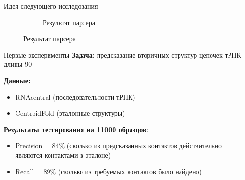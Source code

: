 \documentclass{beamer}
\begin{document}
\begin{frame}{Идея следующего исследования}
\begin{figure}
\begin{subfigure}{.3\textwidth}
\end{subfigure}
\begin{subfigure}{.3\textwidth}
  \centering
  \caption{Результат парсера}
\end{subfigure}%
\end{figure}

\end{frame}

\begin{frame}{Первые эксперименты}
\textbf{Задача:} предсказание вторичных структур цепочек тРНК длины 90

\vspace{6mm}
\textbf{Данные:}
\begin{itemize}
    \item RNAcentral (последовательности тРНК)
    \item CentroidFold (эталонные структуры)
\end{itemize}

\vspace{6mm}

\textbf{Результаты тестирования на 11000 образцов:}
\begin{itemize}
    \item Precision = 84\% (сколько из предсказанных контактов действительно являются контактами в эталоне)
    \item Recall = 89\% (сколько из требуемых контактов было найдено)
\end{itemize}

\end{frame}
\end{document}
